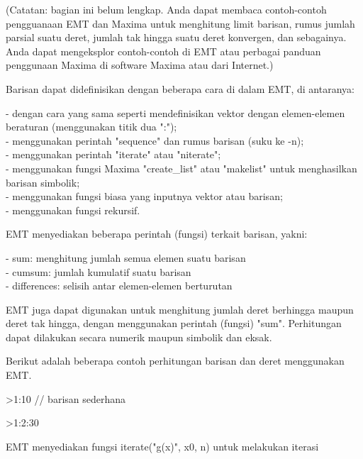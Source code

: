 \documentclass[a4paper,10pt]{article}
\begin{document}
\begin{eulernotebook}
\begin{eulercomment}
\begin{eulercomment}
\begin{eulercomment}
\begin{eulercomment}
\begin{eulercomment}
\begin{eulercomment}
\begin{eulercomment}
\begin{eulercomment}
\begin{euleroutput}
\end{euleroutput}
\begin{eulercomment}
(Catatan: bagian ini belum lengkap. Anda dapat membaca contoh-contoh pengguanaan EMT dan
Maxima untuk menghitung limit barisan, rumus jumlah parsial suatu deret, jumlah tak hingga
suatu deret konvergen, dan sebagainya. Anda dapat mengeksplor contoh-contoh di EMT atau
perbagai panduan penggunaan Maxima di software Maxima atau dari Internet.)

Barisan dapat didefinisikan dengan beberapa cara di dalam EMT, di antaranya:

- dengan cara yang sama seperti mendefinisikan vektor dengan elemen-elemen beraturan
(menggunakan titik dua ":");\\
- menggunakan perintah "sequence" dan rumus barisan (suku ke -n);\\
- menggunakan perintah "iterate" atau "niterate";\\
- menggunakan fungsi Maxima "create\_list" atau "makelist" untuk menghasilkan barisan
simbolik;\\
- menggunakan fungsi biasa yang inputnya vektor atau barisan;\\
- menggunakan fungsi rekursif.

EMT menyediakan beberapa perintah (fungsi) terkait barisan, yakni:

- sum: menghitung jumlah semua elemen suatu barisan\\
- cumsum: jumlah kumulatif suatu barisan\\
- differences: selisih antar elemen-elemen berturutan

EMT juga dapat digunakan untuk menghitung jumlah deret berhingga maupun deret tak hingga,
dengan menggunakan perintah (fungsi) "sum". Perhitungan dapat dilakukan secara numerik
maupun simbolik dan eksak.

Berikut adalah beberapa contoh perhitungan barisan dan deret menggunakan EMT.
\end{eulercomment}
\begin{eulerprompt}
>1:10 // barisan sederhana
\end{eulerprompt}
\begin{euleroutput}
  [1,  2,  3,  4,  5,  6,  7,  8,  9,  10]
\end{euleroutput}
\begin{eulerprompt}
>1:2:30
\end{eulerprompt}
\begin{euleroutput}
  [1,  3,  5,  7,  9,  11,  13,  15,  17,  19,  21,  23,  25,  27,  29]
\end{euleroutput}
\begin{eulercomment}
EMT menyediakan fungsi iterate("g(x)", x0, n) untuk melakukan iterasi


\end{eulercomment}
\end{eulercomment}
\end{eulercomment}
\end{eulercomment}
\end{eulercomment}
\end{eulercomment}
\end{eulercomment}
\end{eulercomment}
\end{eulercomment}
\end{eulernotebook}
\end{document}
